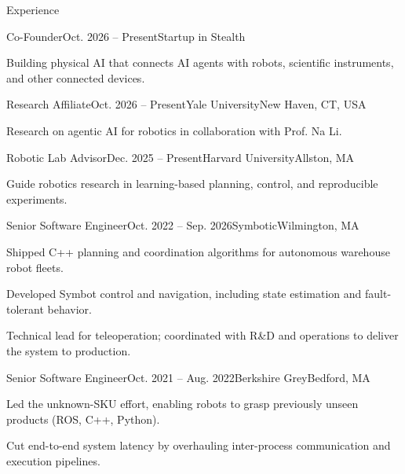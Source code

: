 \documentclass{resume}
\begin{document}
\small



\begin{rSection}{Experience}

\begin{rSubsection}{Co-Founder}{Oct. 2026 -- Present}{Startup in Stealth}{}
\item Building physical AI that connects AI agents with robots, scientific instruments, and other connected devices.
\end{rSubsection}

\begin{rSubsection}{Research Affiliate}{Oct. 2026 -- Present}{Yale University}{New Haven, CT, USA}
\item Research on agentic AI for robotics in collaboration with Prof. Na Li.
\end{rSubsection}

\begin{rSubsection}{Robotic Lab Advisor}{Dec. 2025 -- Present}{Harvard University}{Allston, MA}
\item Guide robotics research in learning-based planning, control, and reproducible experiments.
\end{rSubsection}

\begin{rSubsection}{Senior Software Engineer}{Oct. 2022 -- Sep. 2026}{Symbotic}{Wilmington, MA}
\item Shipped C++ planning and coordination algorithms for autonomous warehouse robot fleets.
\item Developed Symbot control and navigation, including state estimation and fault-tolerant behavior.
\item Technical lead for teleoperation; coordinated with R\&D and operations to deliver the system to production.
\end{rSubsection}

\begin{rSubsection}{Senior Software Engineer}{Oct. 2021 -- Aug. 2022}{Berkshire Grey}{Bedford, MA}
\item Led the unknown-SKU effort, enabling robots to grasp previously unseen products (ROS, C++, Python).
\item Cut end-to-end system latency by overhauling inter-process communication and execution pipelines.
\end{rSubsection}

\end{rSection}
\end{document}
